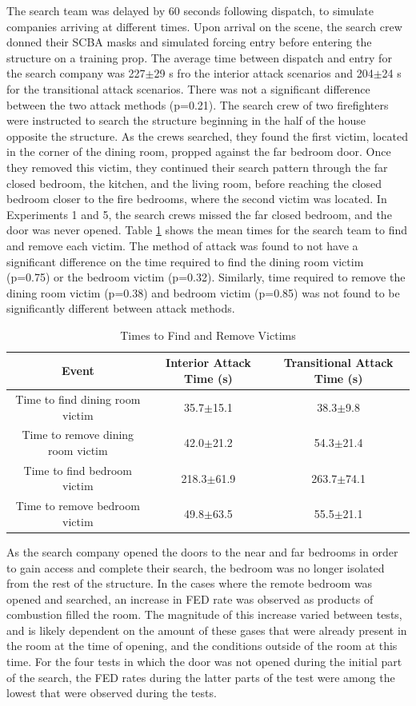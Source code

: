 \documentclass[12pt,oneside]{article}
\begin{document}
The search team was delayed by 60 seconds following dispatch, to simulate companies arriving at different times. Upon arrival on the scene, the search crew donned their SCBA masks and simulated forcing entry before entering the structure on a training prop. The average time between dispatch and entry for the search company was 227$\pm$29 s fro the interior attack scenarios and 204$\pm$24 s for the transitional attack scenarios. There was not a significant difference between the two attack methods (p=0.21). The search crew of two firefighters were instructed to search the structure beginning in the half of the house opposite the structure. As the crews searched, they found the first victim, located in the corner of the dining room, propped against the far bedroom door. Once they removed this victim, they continued their search pattern through the far closed bedroom, the kitchen, and the living room, before reaching the closed bedroom closer to the fire bedrooms, where the second victim was located. In Experiments 1 and 5, the search crews missed the far closed bedroom, and the door was never opened. Table \ref{tab:victim_times} shows the mean times for the search team to find and remove each victim. The method of attack was found to not have a significant difference on the time required to find the dining room victim (p=0.75) or the bedroom victim (p=0.32). Similarly, time required to remove the dining room victim (p=0.38) and bedroom victim (p=0.85) was not found to be significantly different between attack methods. 

\begin{table}[!ht]
    \centering
    \caption{Times to Find and Remove Victims}
    \label{tab:victim_times}
    \begin{tabular}{ccc}
    \toprule[1.5pt]
 	 Event&								Interior Attack Time (s)&	Transitional Attack Time (s)\\
 	\midrule 
  	Time to find dining room victim&	35.7$\pm$15.1&				38.3$\pm$9.8\\
  	Time to remove dining room victim&	42.0$\pm$21.2&				54.3$\pm$21.4\\
  	Time to find bedroom victim&		218.3$\pm$61.9&				263.7$\pm$74.1\\
  	Time to remove bedroom victim&		49.8$\pm$63.5&				55.5$\pm$21.1\\
 	\bottomrule[1.25pt] 
    \end{tabular}
\end{table}

As the search company opened the doors to the near and far bedrooms in order to gain access and complete their search, the bedroom was no longer isolated from the rest of the structure. In the cases where the remote bedroom was opened and searched, an increase in FED rate was observed as products of combustion filled the room. The magnitude of this increase varied between tests, and is likely dependent on the amount of these gases that were already present in the room at the time of opening, and the conditions outside of the room at this time.  For the four tests in which the door was not opened during the initial part of the search, the FED rates during the latter parts of the test were among the lowest that were observed during the tests. 
\end{document}
